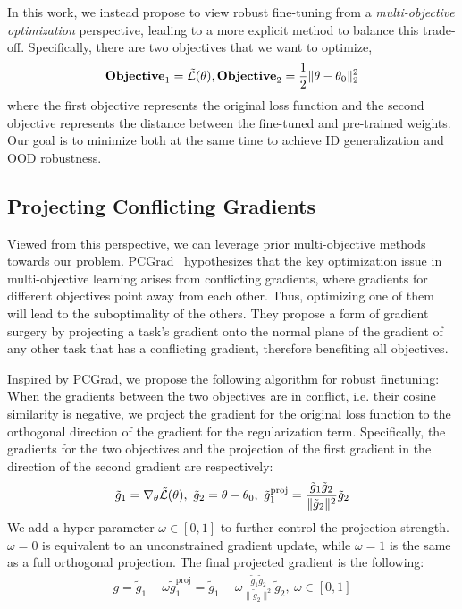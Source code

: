 In this work, we instead propose to view robust fine-tuning from a \textit{multi-objective optimization} perspective, leading to a more explicit method to balance this trade-off. Specifically, there are two objectives that we want to optimize,
\begin{align}
    \label{eq:two_obj}
    \textbf{Objective}_1 = \Tilde{\mathcal{L}}(\theta), \textbf{Objective}_2 = \frac{1}{2}\|\theta-\theta_0\|^2_2
\end{align}
where the first objective represents the original loss function and the second objective represents the distance between the fine-tuned and pre-trained weights. Our goal is to minimize both at the same time to achieve ID generalization and OOD robustness.


\subsection{Projecting Conflicting Gradients}
Viewed from this perspective, we can leverage prior multi-objective methods towards our problem. PCGrad~\citep{yu2020gradientsurgerymultitasklearning} hypothesizes that the key optimization issue in multi-objective learning arises from conflicting gradients, where gradients for different objectives point away from each other. Thus, optimizing one of them will lead to the suboptimality of the others.
They propose a form of gradient surgery by projecting a task’s gradient onto the normal plane of the gradient of any other task that has a conflicting gradient, therefore benefiting all objectives. 

Inspired by PCGrad, we propose the following algorithm for robust finetuning: When the gradients between the two objectives are in conflict, i.e. their cosine similarity is negative, we project the gradient for the original loss function to the orthogonal direction of the gradient for the regularization term. Specifically, the gradients for the two objectives and the projection of the first gradient in the direction of the second gradient are respectively:
\begin{align}
    \label{eq:grad}
    \tilde{g}_{1} = \nabla_{\theta} \Tilde{\mathcal{L}}(\theta),
    ~\tilde{g}_{2} = \theta - \theta_0,
    ~\tilde{g}_{1}^{\text{proj}} = \frac{\tilde{g}_{1} \tilde{g}_{2}}{\|\tilde{g}_{2}\|^2} \tilde{g}_{2}
\end{align}
We add a hyper-parameter $\omega \in [0,1]$ to further control the projection strength. $\omega=0$ is equivalent to an unconstrained gradient update, while $\omega=1$ is the same as a full orthogonal projection. The final projected gradient is the following:
\begin{align}
    \label{eq:final_grad}
    g = \tilde{g}_1 - \omega \tilde{g}_{1}^{\text{proj}} = \tilde{g}_1 -\omega \frac{\tilde{g}_{1} \tilde{g}_{2}}{\|\tilde{g}_{2}\|^2} \tilde{g}_{2},~\omega \in [0,1]
\end{align}

